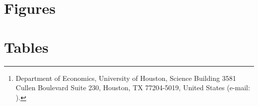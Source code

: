 \documentclass{wptemp}
\begin{document}
	\author{{\selectfont\large{\textsc{Hussain Hadah}}\thanks{Department of Economics, University of Houston, Science Building 3581 Cullen Boulevard Suite 230, Houston, TX 77204-5019, United States (e-mail: ).}}}
	\date{\selectfont\normalsize{\textsc{\today}}}
	\maketitle

 


\thispagestyle{empty}
\clearpage
{}

% 

\begin{appendices}
\section{Figures}\label{appendix:figs}




\section{Tables}\label{appendix:tabs}




\end{appendices}
\end{document}
